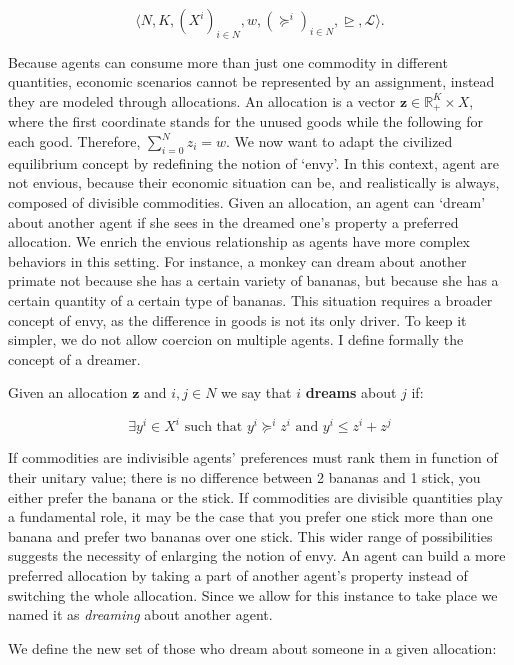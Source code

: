 \[\langle N,K,(X^i)_{i\in N}, w, (\succeq^i)_{i\in N}, \trianglerighteq, \mathcal{L}\rangle.\]

Because agents can consume more than just one commodity in different quantities, economic scenarios cannot be represented by an assignment, instead they are modeled through allocations. An allocation is a vector $\textbf{z}\in \mathbb{R}_+^K\times X$, where the first coordinate stands for the unused goods while the following for each good. Therefore, $\sum_{i=0}^Nz_i=w$. We now want to adapt the civilized equilibrium concept by redefining the notion of `envy'. In this context, agent are not envious, because their economic situation can be, and realistically is always, composed of divisible commodities. Given an allocation, an agent can `dream' about another agent if she sees in the dreamed one's property a preferred allocation. We enrich the envious relationship as agents have more complex behaviors in this setting. For instance, a monkey can dream about another primate not because she has a certain variety of bananas, but because she has a certain quantity of a certain type of bananas. This situation requires a broader concept of envy, as the difference in goods is not its only driver. To keep it simpler, we do not allow coercion on multiple agents. I define formally the concept of a dreamer.

\begin{definition}
    Given an allocation $\textbf{z}$ and $i,j\in N$ we say that $i$ \textbf{dreams} about $j$ if:

\[\exists y^i\in X^i \text{ such that } y^i\succeq^iz^i \text{ and } y^i\leq z^i+z^j\]
\end{definition}

If commodities are indivisible agents' preferences must rank them in function of their unitary value; there is no difference between 2 bananas and 1 stick, you either prefer the banana or the stick. If commodities are divisible quantities play a fundamental role, it may be the case that you prefer one stick more than one banana and prefer two bananas over one stick. This wider range of possibilities suggests the necessity of enlarging the notion of envy. An agent can build a more preferred allocation by taking a part of another agent's property instead of switching the whole allocation. Since we allow for this instance to take place we named it as \textit{dreaming} about another agent.

We define the new set of those who dream about someone in a given allocation:

